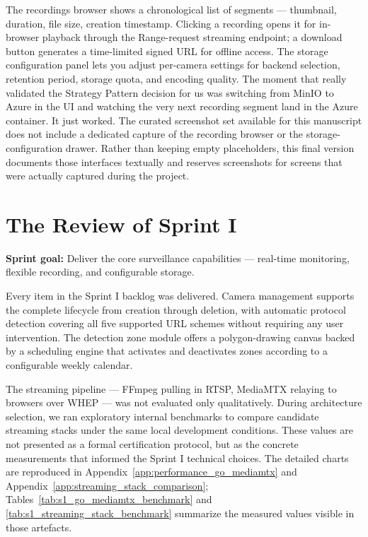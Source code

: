 \documentclass[12pt,a4paper,oneside]{report}
\begin{document}
\hspace{0.8cm}The recordings browser shows a chronological list of segments — thumbnail, duration, file size, creation timestamp. Clicking a recording opens it for in-browser playback through the Range-request streaming endpoint; a download button generates a time-limited signed URL for offline access. The storage configuration panel lets you adjust per-camera settings for backend selection, retention period, storage quota, and encoding quality. The moment that really validated the Strategy Pattern decision for us was switching from MinIO to Azure in the UI and watching the very next recording segment land in the Azure container. It just worked.
\hspace{0.8cm}The curated screenshot set available for this manuscript does not include a dedicated capture of the recording browser or the storage-configuration drawer. Rather than keeping empty placeholders, this final version documents those interfaces textually and reserves screenshots for screens that were actually captured during the project.

\section{The Review of Sprint I}
\label{sec:s1_review}

\hspace{0.8cm}\textbf{Sprint goal:} Deliver the core surveillance capabilities — real-time monitoring, flexible recording, and configurable storage.

\hspace{0.8cm}Every item in the Sprint I backlog was delivered. Camera management supports the complete lifecycle from creation through deletion, with automatic protocol detection covering all five supported URL schemes without requiring any user intervention. The detection zone module offers a polygon-drawing canvas backed by a scheduling engine that activates and deactivates zones according to a configurable weekly calendar.

\hspace{0.8cm}The streaming pipeline --- FFmpeg pulling in RTSP, MediaMTX relaying to browsers over WHEP --- was not evaluated only qualitatively. During architecture selection, we ran exploratory internal benchmarks to compare candidate streaming stacks under the same local development conditions. These values are not presented as a formal certification protocol, but as the concrete measurements that informed the Sprint I technical choices. The detailed charts are reproduced in Appendix~\ref{app:performance_go_mediamtx} and Appendix~\ref{app:streaming_stack_comparison}; Tables~\ref{tab:s1_go_mediamtx_benchmark} and \ref{tab:s1_streaming_stack_benchmark} summarize the measured values visible in those artefacts.
\end{document}
